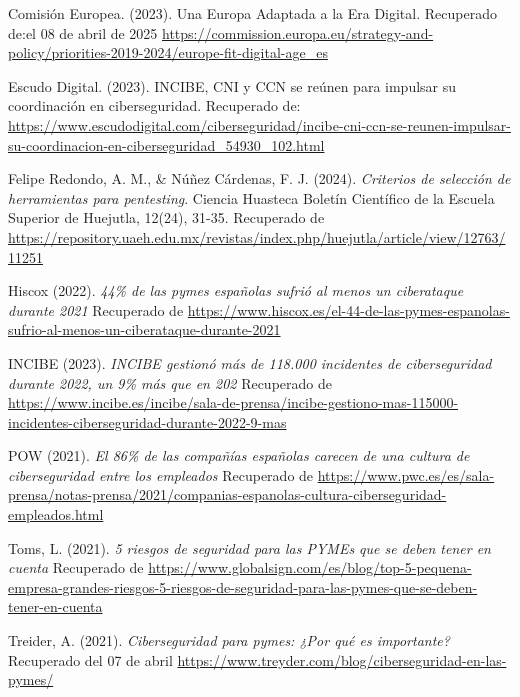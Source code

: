 \documentclass[a4paper, 10pt]{article}
\begin{document}
\begin{thebibliography}{20}
    Comisión Europea. (2023). Una Europa Adaptada a la Era Digital. Recuperado de:el 08 de abril de 2025  \url{https://commission.europa.eu/strategy-and-policy/priorities-2019-2024/europe-fit-digital-age_es}

    Escudo Digital. (2023). INCIBE, CNI y CCN se reúnen para impulsar su coordinación en ciberseguridad. Recuperado de: \url{https://www.escudodigital.com/ciberseguridad/incibe-cni-ccn-se-reunen-impulsar-su-coordinacion-en-ciberseguridad_54930_102.html}

    Felipe Redondo, A. M., \& Núñez Cárdenas, F. J. (2024). \textit{Criterios de selección de herramientas para pentesting}. Ciencia Huasteca Boletín Científico de la Escuela Superior de Huejutla, 12(24), 31-35. Recuperado de \url{https://repository.uaeh.edu.mx/revistas/index.php/huejutla/article/view/12763/11251}
    
    Hiscox (2022). \textit{ 44\% de las pymes españolas sufrió al menos un ciberataque durante 2021} Recuperado de \url{https://www.hiscox.es/el-44-de-las-pymes-espanolas-sufrio-al-menos-un-ciberataque-durante-2021}

    INCIBE (2023). \textit{INCIBE gestionó más de 118.000 incidentes de ciberseguridad durante 2022, un 9\% más que en 202} Recuperado de \url{https://www.incibe.es/incibe/sala-de-prensa/incibe-gestiono-mas-115000-incidentes-ciberseguridad-durante-2022-9-mas}

    POW (2021). \textit{El 86\% de las compañías españolas carecen de una cultura de ciberseguridad entre los empleados} Recuperado de \url{https://www.pwc.es/es/sala-prensa/notas-prensa/2021/companias-espanolas-cultura-ciberseguridad-empleados.html}

    Toms, L. (2021). \textit{5 riesgos de seguridad para las PYMEs que se deben tener en cuenta} Recuperado de \url{https://www.globalsign.com/es/blog/top-5-pequena-empresa-grandes-riesgos-5-riesgos-de-seguridad-para-las-pymes-que-se-deben-tener-en-cuenta}
    
    Treider, A. (2021). \textit{Ciberseguridad para pymes: ¿Por qué es importante?} Recuperado del 07 de abril \url{https://www.treyder.com/blog/ciberseguridad-en-las-pymes/}
\end{thebibliography}


\clearpage
\end{document}
